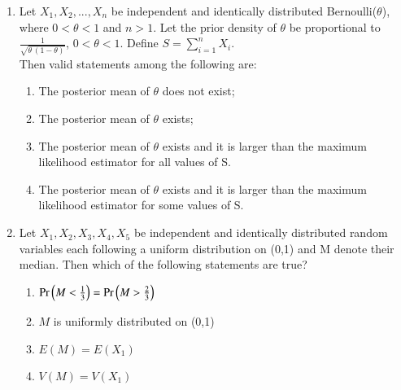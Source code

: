 \begin{enumerate}[label=\thesection.\arabic*.,ref=\thesection.\theenumi]
\item Let $X_1,X_2,...,X_n$ be independent and identically distributed Bernoulli($\theta$), where $0<\theta<1$ and $n>1$. Let the prior density of $\theta$ be proportional to $\frac{1}{\sqrt{\theta\,(1-\theta)}}$, $0<\theta<1$. Define $S=\sum_{i=1}^nX_i$.\\[1pt] Then valid statements among the following are:
\begin{enumerate}[label = \arabic*.]
    \item The posterior mean of $\theta$ does not exist;
    \item The posterior mean of $\theta$ exists;
    \item The posterior mean of $\theta$ exists and it is larger than the maximum likelihood estimator for all values of S.
    \item The posterior mean of $\theta$ exists and it is larger than the maximum likelihood estimator for some values of S.
\end{enumerate}
\solution

%
\item Let $X_1,X_2,X_3,X_4,X_5$ be independent and identically distributed random variables each following a uniform distribution on (0,1) and M denote their median. Then which of the following statements are true?
\begin{enumerate}
    \item $\Pr\left(M<\frac{1}{3}\right)=\Pr\left(M>\frac{2}{3}\right)$\\
    \item $M$ is uniformly distributed on (0,1)\\
    \item $E(M)=E(X_1)$\\
    \item $V(M)=V(X_1)$
\end{enumerate}
\solution



\end{enumerate}
